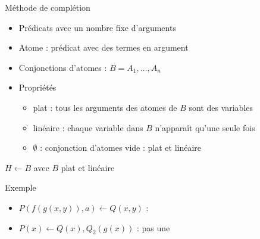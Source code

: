 \begin{frame}{Méthode de complétion}
  \begin{center}
  \end{center}
\end{frame}

\begin{frame}{\csclause}
  \begin{itemize}[<+->]
  \item Prédicats avec un nombre fixe d'arguments
  \item Atome : prédicat avec des termes en argument
  \item Conjonctions d'atomes : $B = A_1, ..., A_n$
  \item Propriétés
    \begin{itemize}
    \item plat : tous les arguments des atomes de $B$ sont des variables
    \item linéaire : chaque variable dans $B$ n'apparaît qu'une seule fois
    \item $\emptyset$ : conjonction d'atomes vide : plat et linéaire
    \end{itemize}
  \end{itemize}
  \begin{block}{\csclause}
    $H \leftarrow B$ avec $B$ plat et linéaire
  \end{block}
  \begin{exampleblock}{Exemple}
    \begin{itemize}
     \item $P(f(g(x,y)),a) \leftarrow Q(x,y)$ : \csclause
     \item $P(x) \leftarrow Q(x),Q_2(g(x))$ : pas une \csclause
    \end{itemize}
  \end{exampleblock}
\end{frame}

